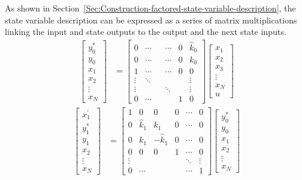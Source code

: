 \documentclass[a4paper,twoside,10pt,english]{report}
\begin{document}
As shown in Section~\ref{Sec:Construction-factored-state-variable-description},
the state variable description can be expressed as a series of matrix
multiplications linking the input and state outputs to the output and the next
state inputs.
\begin{align*}
\left[\begin{array}{c}
y_{0}^{*}\\
y_{0}\\
x_{1}\\
x_{2}\\
\vdots\\
x_{N}
\end{array}\right] & = \left[\begin{array}{cccccc}
0 & \cdots & & \cdots & 0 & \hat{k}_{0} \\
0 & \cdots & & \cdots & 0 & k_{0} \\
1 & \cdots & & \cdots & 0 & 0 \\
\vdots & \ddots & & & & \vdots \\
\vdots &  &  & \ddots &  & \vdots\\
0 & \cdots &  &  & 1 & 0
\end{array}\right]\left[\begin{array}{c}
x_{1}\\
x_{2}\\
x_{3}\\
\vdots\\
x_{N} \\
u
\end{array}\right]
\end{align*}
\begin{align*}
\left[\begin{array}{c}
x_{1}^{\prime}\\
y_{1}^{*}\\
y_{1}\\
x_{2}\\
\vdots\\
x_{N}
\end{array}\right] & = \left[\begin{array}{cccccc}
1 & 0 & 0 & 0 & \cdots & 0\\
0 & \hat{k}_{1} & k_{1} & 0 & \cdots & 0\\
0 & k_{1} & -\hat{k}_{1} & 0 & \cdots & 0\\
0 & 0 & 0 & 1 & \cdots & 0\\
\vdots &  &  & & \ddots & \vdots\\
0 & \cdots & & & \cdots & 1
\end{array}\right]\left[\begin{array}{c}
y_{0}^{*}\\
y_{0}\\
x_{1}\\
x_{2}\\
\vdots\\
x_{N}
\end{array}\right]
\end{align*}
\end{document}
